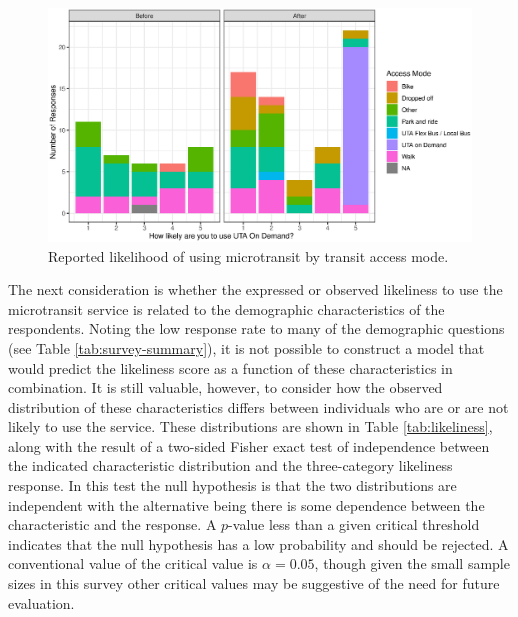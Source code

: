 \documentclass[smartcities,article,submit,moreauthors,pdftex]{Definitions/mdpi}
\begin{document}
\begin{figure}
    \centering
    \includegraphics[width = \textwidth]{access_mode.eps}
    \caption{Reported likelihood of using microtransit by transit access mode.}
    \label{fig:likelihood}
\end{figure}

The next consideration is whether the expressed or observed likeliness to use the microtransit service is related to the demographic characteristics of the respondents. Noting the low response rate to many of the demographic questions (see Table \ref{tab:survey-summary}), it is not possible to construct a model that would predict the likeliness score as a function of these characteristics in combination. It is still valuable, however, to consider how the observed distribution of these characteristics differs between individuals who are or are not likely to use the service. These distributions are shown in Table \ref{tab:likeliness}, along with the result of a two-sided Fisher exact test of independence between the indicated characteristic distribution and the three-category likeliness response. In this test the null hypothesis is that the two distributions are independent with the alternative being there is some dependence between the characteristic and the response. A $p$-value less than a given critical threshold indicates that the null hypothesis has a low probability and should be rejected. A conventional value of the critical value is $\alpha=0.05$, though given the small sample sizes in this survey other critical values may be suggestive of the need for future evaluation.
\end{document}
